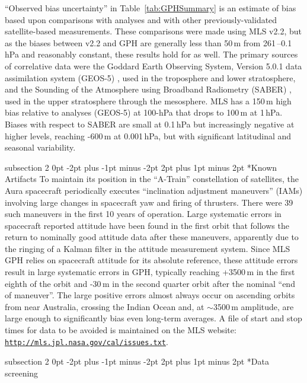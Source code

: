 \documentclass[11pt,draft]{report}
\makeatletter
\renewcommand{\subsection}{\@startsection%
  {subsection}%
  {2}%
  {0pt}%
  {-2pt plus -1pt minus -2pt}%
  {2pt plus 1pt minus 2pt}%
  {\large\sffamily\fontseries{sb}\selectfont\flushleft\color{SectionColor}\figureversion{tabular}}}%
\makeatother
\begin{document}
``Observed bias uncertainty'' in Table~\ref{tab:GPHSummary} is an
estimate of bias based upon comparisons with analyses and with other
previously-validated satellite-based measurements.  These comparisons
were made using MLS v2.2, but as the biases between v2.2 and \thisv GPH
are generally less than 50\,m from 261\,--0.1\,hPa and reasonably
constant, these results hold for \thisv as well.  The primary sources of
correlative data were the Goddard Earth Observing System, Version 5.0.1
data assimilation system (GEOS-5) \citep{RieneckerEtal07}, used in the
troposphere and lower stratosphere, and the Sounding of the Atmosphere
using Broadband Radiometry (SABER) \citep{MlynczakAndRussell95}, used in
the upper stratosphere through the mesosphere.  MLS has a 150\,m high
bias relative to analyses (GEOS-5) at 100-hPa that drops to 100\,m at
1\,hPa.  Biases with respect to SABER are small at 0.1\,hPa but
increasingly negative at higher levels, reaching -600\,m at 0.001\,hPa,
but with significant latitudinal and seasonal variability.

\subsection*{Known Artifacts}
To maintain its position in the ``A-Train'' constellation of satellites,
the Aura spacecraft periodically executes ``inclination adjustment
maneuvers'' (IAMs) involving large changes in spacecraft yaw and firing
of thrusters.  There were 39 such maneuvers in the first 10 years of
operation.  Large systematic errors in spacecraft reported attitude have
been found in the first orbit that follows the return to nominally good
attitude data after these maneuvers, apparently due to the ringing of a
Kalman filter in the attitude measurement system. Since MLS GPH relies
on spacecraft attitude for its absolute reference, these attitude errors
result in large systematic errors in GPH, typically reaching +3500\,m in
the first eighth of the orbit and -30\,m in the second quarter orbit
after the nominal ``end of maneuver''.  The large positive errors almost
always occur on ascending orbits from near Australia, crossing the
Indian Ocean and, at $\sim$3500\,m amplitude, are large enough to
significantly bias even long-term averages.  A file of start and stop
times for data to be avoided is maintained on the MLS website:
\href{http://mls.jpl.nasa.gov/cal/issues.txt}{\texttt{http://mls.jpl.nasa.gov/cal/issues.txt}}.


\subsection*{Data screening}
\label{sec:GPHScreening}
\end{document}
